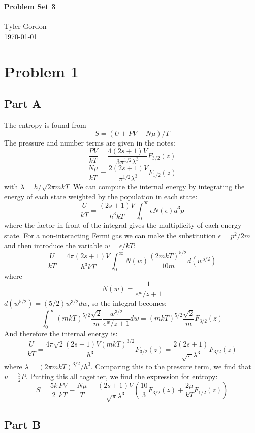 \documentclass[a4paper, 11pt]{article}
\newcommand{\mytitle}{Problem Set 3}
\begin{document}
\noindent
\large\textbf{\mytitle} \\ \\ Tyler Gordon \\
\normalsize \today 
\ \ \hrulefill
\section*{Problem 1}
	\subsection*{Part A}
		The entropy is found from 
		\begin{equation*}
			S = (U + PV - N\mu)/T
		\end{equation*}
		The pressure and number terms are given in the notes:
		\begin{equation*}
			\frac{PV}{kT} = \frac{4(2s+1)V}{3\pi^{1/2}\lambda^3}F_{3/2}(z)
		\end{equation*}
		\begin{equation*}
			\frac{N\mu}{kT} = \frac{2(2s+1)V}{\pi^{1/2}\lambda^3}F_{1/2}(z)
		\end{equation*}
		with $\lambda=h/\sqrt{2\pi mkT}$
		We can compute the internal energy by integrating the energy of each state 
		weighted by the population in each state:
		\begin{equation*}
			\frac{U}{kT} = \frac{(2s+1)V}{h^3kT}\int_0^\infty \epsilon N(\epsilon) d^3p
		\end{equation*}
		where the factor in front of the integral gives the multiplicity of each energy state. 
		For a non-interacting Fermi gas we can make the substitution $\epsilon=p^2/2m$ and 
		then introduce the variable $w=\epsilon/kT$:
		\begin{equation*}
			\frac{U}{kT} = \frac{4\pi(2s+1)V}{h^3kT}\int_0^\infty N(w) \frac{(2mkT)^{5/2}}{10m}d(w^{5/2})
		\end{equation*}
		where
		\begin{equation*}
			N(w) = \frac{1}{e^w/z + 1}
		\end{equation*}
		$d(w^{5/2}) = (5/2)w^{3/2}dw$, so the integral becomes:
		\begin{equation*}
			\int_0^\infty (mkT)^{5/2}\frac{\sqrt{2}}{m}\frac{w^{3/2}}{e^w/z+1}dw =(mkT)^{5/2}\frac{\sqrt{2}}{m}F_{3/2}(z)
		\end{equation*}
		And therefore the internal energy is:
		\begin{equation*}
			\frac{U}{kT} = \frac{4\pi\sqrt{2}(2s+1)V(mkT)^{3/2}}{h^3}F_{3/2}(z) = \frac{2(2s+1)}{\sqrt{\pi}\lambda^3}F_{3/2}(z)
		\end{equation*}
		where $\lambda = (2\pi mkT)^{3/2}/h^3$. Comparing this to the pressure term, we find that 
		$u = \frac{3}{2}P$. Putting this all together, we find the expression for entropy:
		\begin{equation*}
			S = \frac{5k}{2}\frac{PV}{kT} - \frac{N\mu}{T} = \frac{(2s+1)V}{\sqrt{\pi}\lambda^3}\left(\frac{10}{3}F_{3/2}(z) + \frac{2\mu}{kT}F_{1/2}(z)\right)
		\end{equation*}
	\subsection*{Part B}
		
\end{document}
